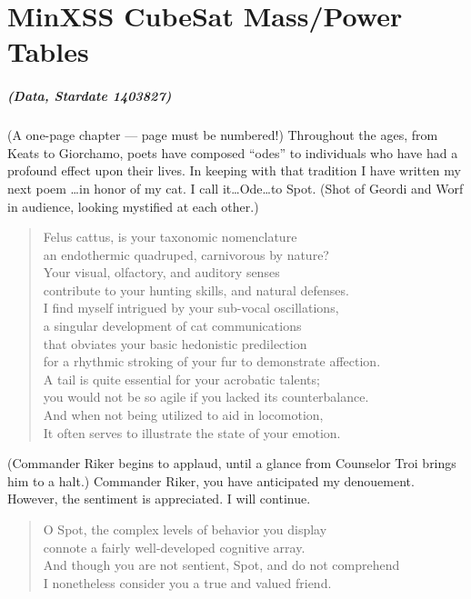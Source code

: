 \chapter{MinXSS CubeSat Mass/Power Tables}	\OnePageChapter         %
\label{appendixmvp}

\noindent\paragraph{(Data, Stardate 1403827)}
(A one-page chapter --- page must be numbered!)
Throughout the ages, from Keats to Giorchamo, poets have
composed ``odes'' to individuals who have had a profound effect
upon their lives.  In keeping with that tradition
I have written my next poem \ldots in honor of my cat.
I call it\ldots{}Ode\ldots{}to Spot.
(Shot of Geordi and Worf in audience,
looking mystified at each other.)


\begin{quotation}
\noindent Felus cattus, is your taxonomic nomenclature \\
an endothermic quadruped, carnivorous by nature? \\
Your visual, olfactory, and auditory senses \\
contribute to your hunting skills, and natural defenses. \\
I find myself intrigued by your sub-vocal oscillations, \\
a singular development of cat communications \\
that obviates your basic hedonistic predilection \\
for a rhythmic stroking of your fur to demonstrate affection. \\
A tail is quite essential for your acrobatic talents; \\
you would not be so agile if you lacked its counterbalance. \\
And when not being utilized to aid in locomotion, \\
It often serves to illustrate the state of your emotion.
\end{quotation}


\noindent(Commander Riker begins to applaud, until a
glance from Counselor Troi brings him to a halt.)
Commander Riker, you have anticipated my denouement.
However, the sentiment is appreciated.  I will continue.


\begin{quotation}
\noindent O Spot, the complex levels of behavior you display \\
connote a fairly well-developed cognitive array. \\
And though you are not sentient, Spot, and do not comprehend \\
I nonetheless consider you a true and valued friend.
\end{quotation}
